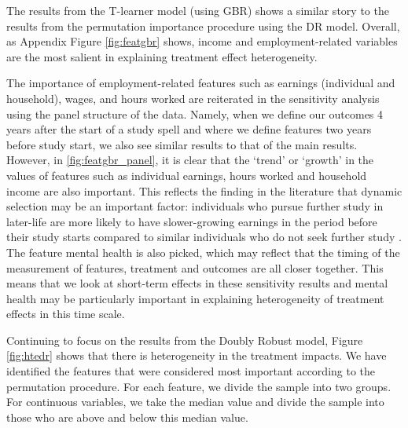 \documentclass[12pt, a4paper]{article}
\begin{document}
The results from the T-learner model (using GBR) shows a similar story to the
results from the permutation importance procedure using the DR model. Overall,
as Appendix Figure \ref{fig:featgbr} shows, income and employment-related
variables are the most salient in explaining treatment effect heterogeneity. 

The importance of employment-related features such as earnings (individual and household), wages, and hours worked are reiterated in the sensitivity analysis using the panel structure of the data. Namely, when we define our outcomes 4 years after the start of a study spell and where we define features two years before study start, we also see similar results to that of the main results. However, in  \ref{fig:featgbr_panel}, it is clear that the `trend' or `growth' in the values of features such as individual earnings, hours worked and household income are also important. This reflects the finding in the literature that dynamic selection may be an important factor: individuals who pursue further study in later-life are more likely to have slower-growing earnings in the period before their study starts compared
to similar individuals who do not seek further study \citep{jacobson2005, dynarski2016, dynarski2018}. The feature mental health is also picked, which may reflect that the timing of the measurement of features, treatment and outcomes are all closer together. This means that we  look at short-term effects in these sensitivity results and mental health may be particularly important in explaining heterogeneity of treatment effects in this time scale. 



Continuing to focus on the results from the Doubly Robust model, Figure
\ref{fig:htedr} shows that there is heterogeneity in the treatment impacts. We
have identified the features that were considered most important according to
the permutation procedure. For each feature, we divide the sample into two
groups. For continuous variables, we take the median value and divide the
sample into those who are above and below this median value. 
\end{document}
